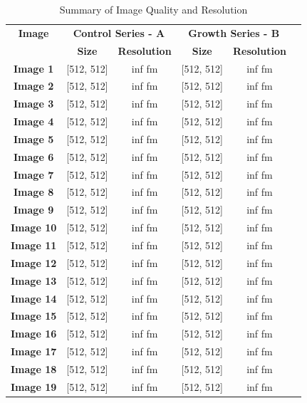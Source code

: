 \documentclass{article}
\begin{document}
\begin{table}[h!]
\centering
\caption{Summary of Image Quality and Resolution}\label{table:Quality-Resolution}
\begin{tabular}{|c|c|c|c|c|c|}
\hline
\multicolumn{1}{|c|}{\textbf{Image}}&\multicolumn{2}{|c|}{\textbf{Control Series - A}}&\multicolumn{2}{|c|}{\textbf{Growth Series - B}}\\ 
\cline{2-5}
& \textbf{Size} & \textbf{Resolution} & \textbf{Size} & \textbf{Resolution} \\
\hline
\textbf{Image 1} & [512, 512] & {inf fm} & [512, 512] & {inf fm} \\
\textbf{Image 2} & [512, 512] & {inf fm} & [512, 512] & {inf fm} \\
\textbf{Image 3} & [512, 512] & {inf fm} & [512, 512] & {inf fm} \\
\textbf{Image 4} & [512, 512] & {inf fm} & [512, 512] & {inf fm} \\
\textbf{Image 5} & [512, 512] & {inf fm} & [512, 512] & {inf fm} \\
\textbf{Image 6} & [512, 512] & {inf fm} & [512, 512] & {inf fm} \\
\textbf{Image 7} & [512, 512] & {inf fm} & [512, 512] & {inf fm} \\
\textbf{Image 8} & [512, 512] & {inf fm} & [512, 512] & {inf fm} \\
\textbf{Image 9} & [512, 512] & {inf fm} & [512, 512] & {inf fm} \\
\textbf{Image 10} & [512, 512] & {inf fm} & [512, 512] & {inf fm} \\
\textbf{Image 11} & [512, 512] & {inf fm} & [512, 512] & {inf fm} \\
\textbf{Image 12} & [512, 512] & {inf fm} & [512, 512] & {inf fm} \\
\textbf{Image 13} & [512, 512] & {inf fm} & [512, 512] & {inf fm} \\
\textbf{Image 14} & [512, 512] & {inf fm} & [512, 512] & {inf fm} \\
\textbf{Image 15} & [512, 512] & {inf fm} & [512, 512] & {inf fm} \\
\textbf{Image 16} & [512, 512] & {inf fm} & [512, 512] & {inf fm} \\
\textbf{Image 17} & [512, 512] & {inf fm} & [512, 512] & {inf fm} \\
\textbf{Image 18} & [512, 512] & {inf fm} & [512, 512] & {inf fm} \\
\textbf{Image 19} & [512, 512] & {inf fm} & [512, 512] & {inf fm} \\

\end{tabular}
\end{table}
\end{document}

